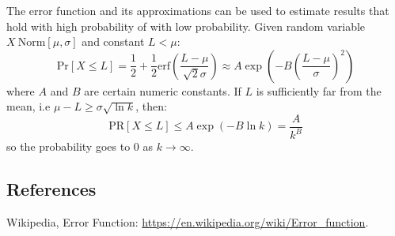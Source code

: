 \documentclass[twocolumn]{article}
\begin{document}
The error function and its approximations can be used to estimate results that hold with high probability of with low probability. Given random variable $X ~ \textrm{Norm} [\mu,\sigma]$ and constant $L<\mu$:
\begin{equation}
\textrm{Pr}[X\leq L]=\frac{1}{2}+\frac{1}{2} \textrm{erf}\left(\frac{L-\mu}{\sqrt{2}\sigma}\right) \approx A \exp(-B\left(\frac{L-\mu}{\sigma}\right)^{2})
\end{equation}
where $A$ and $B$ are certain numeric constants. If $L$ is sufficiently far from the mean, i.e $\mu-L \geq \sigma \sqrt{\ln{k}}$, then: 
\begin{equation}
\textrm{PR}[X \leq L] \leq A \exp(-B \ln{k}) = \frac{A}{k^{B}}
\end{equation}
so the probability goes to $0$ as $k \rightarrow \infty$.

\subsection*{References}
Wikipedia, Error Function: \url{https://en.wikipedia.org/wiki/Error_function}.
\end{document}
